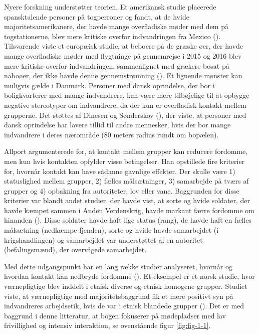 \documentclass[
]{book}
\begin{document}
Nyere forskning understøtter teorien. Et amerikansk studie placerede spansktalende personer på togperroner og fandt, at de hvide majoritetsamerikanere, der havde mange overfladiske møder med dem på togstationerne, blev mere kritiske overfor indvandringen fra Mexico (). Tilsvarende viste et europæisk studie, at beboere på de græske øer, der havde mange overfladiske møder med flygtninge på gennemrejse i 2015 og 2016 blev mere kritiske overfor indvandringen, sammenlignet med grækere bosat på naboøer, der ikke havde denne gennemstrømning (). Et lignende mønster kan muligvis gælde i Danmark. Personer med dansk oprindelse, der bor i boligkvarterer med mange indvandrere, kan være mere tilbøjelige til at opbygge negative stereotyper om indvandrere, da der kun er overfladisk kontakt mellem grupperne. Det støttes af Dinesen og Sønderskov (), der viste, at personer med dansk oprindelse har lavere tillid til andre mennesker, hvis der bor mange indvandrere i deres nærområde (80 meters radius rundt om bopælen).

Allport argumenterede for, at kontakt mellem grupper kan reducere fordomme, men kun hvis kontakten opfylder visse betingelser. Han opstillede fire kriterier for, hvornår kontakt kan have sådanne gavnlige effekter. Der skulle være 1) statuslighed mellem grupper, 2) fælles målsætninger, 3) samarbejde på tværs af grupper og 4) opbakning fra autoriteter, lov eller vane. Baggrunden for disse kriterier var blandt andet studier, der havde vist, at sorte og hvide soldater, der havde kæmpet sammen i Anden Verdenskrig, havde markant færre fordomme om hinanden (). Disse soldater havde haft lige status (rang), de havde haft en fælles målsætning (nedkæmpe fjenden), sorte og hvide havde samarbejdet (i krigshandlingen) og samarbejdet var understøttet af en autoritet (befalingsmænd), der overvågede samarbejdet.

Med dette udgangspunkt har en lang række studier analyseret, hvornår og hvordan kontakt kan nedbryde fordomme (). Et eksempel er et norsk studie, hvor værnepligtige blev inddelt i etnisk diverse og etnisk homogene grupper. Studiet viste, at værnepligtige med majoritetsbaggrund fik et mere positivt syn på indvandreres arbejdsetik, hvis de var i etnisk blandede grupper (). Det er med baggrund i denne litteratur, at bogen fokuserer på mødepladser med lav frivillighed og intensiv interaktion, se ovenstående figur \ref{fig:fig-1-1}.
\end{document}
